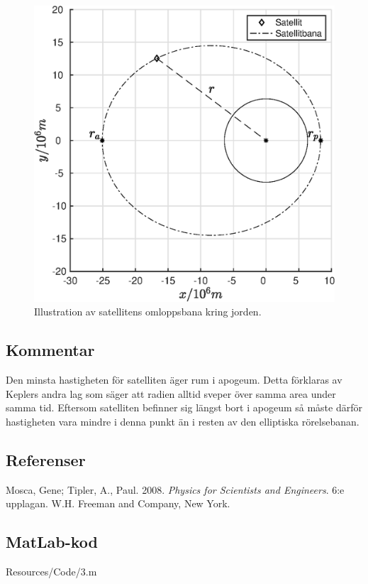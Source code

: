 \begin{figure}[H]
    \centering
    \captionsetup{justification=centering,margin=2cm}
    \includegraphics[scale=0.7]{Resources/Graphics/fig3_1.eps}
    \caption{Illustration av satellitens omloppsbana kring jorden.}
    \label{fig:3_1}
\end{figure}

\subsection*{Kommentar}
Den minsta hastigheten för satelliten äger rum i apogeum. Detta förklaras av Keplers andra lag som säger att radien alltid sveper över samma area under samma tid. Eftersom satelliten befinner sig längst bort i apogeum så måste därför hastigheten vara mindre i denna punkt än i resten av den elliptiska rörelsebanan.

\subsection*{Referenser}
Mosca, Gene; Tipler, A., Paul. 2008. \textit{Physics for Scientists and Engineers}. 6:e upplagan. W.H. Freeman and Company, New York.

\np
\subsection*{MatLab-kod}
 {Resources/Code/3.m}